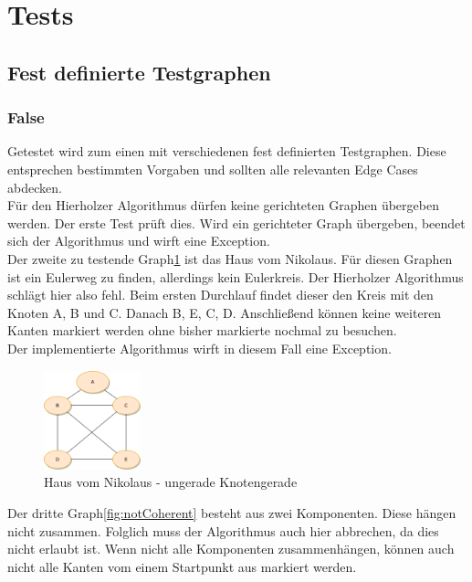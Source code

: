 \section{Tests}

\subsection{Fest definierte Testgraphen}

\subsubsection{False}

Getestet wird zum einen mit verschiedenen fest definierten Testgraphen. Diese entsprechen bestimmten Vorgaben und sollten alle relevanten Edge Cases abdecken.\\

Für den Hierholzer Algorithmus dürfen keine gerichteten Graphen übergeben werden. Der erste Test prüft dies. Wird ein gerichteter Graph übergeben, beendet sich der Algorithmus und wirft eine Exception.\\

Der zweite zu testende Graph\ref{fig:unevenGraph} ist das Haus vom Nikolaus. Für diesen Graphen ist ein Eulerweg zu finden, allerdings kein Eulerkreis. Der Hierholzer Algorithmus schlägt hier also fehl. Beim ersten Durchlauf findet dieser den Kreis mit den Knoten A, B und C. Danach B, E, C, D. Anschließend können keine weiteren Kanten markiert werden ohne bisher markierte nochmal zu besuchen.\\
Der implementierte Algorithmus wirft in diesem Fall eine Exception.

\begin{figure}[htbp]
	\centering
		\includegraphics[width=0.25\textwidth]{Latex/Figs/unevenGraph.png}		
	\caption{Haus vom Nikolaus - ungerade Knotengerade}
	\label{fig:unevenGraph}
\end{figure}

Der dritte Graph\ref{fig:notCoherent} besteht aus zwei Komponenten. Diese hängen nicht zusammen. Folglich muss der Algorithmus auch hier abbrechen, da dies nicht erlaubt ist. Wenn nicht alle Komponenten zusammenhängen, können auch nicht alle Kanten vom einem Startpunkt aus markiert werden.

